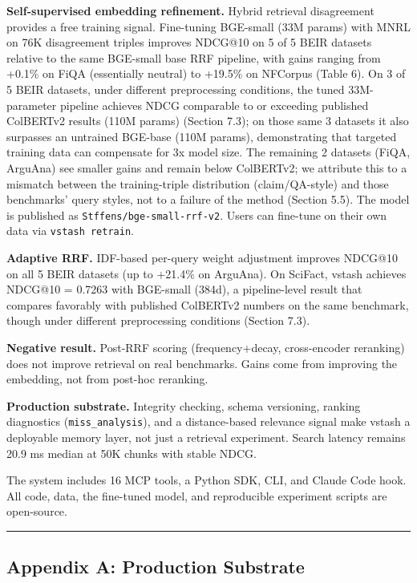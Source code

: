 \documentclass[
  11pt]{article}
\begin{document}
\textbf{Self-supervised embedding refinement.} Hybrid retrieval disagreement provides a free training signal. Fine-tuning BGE-small (33M params) with MNRL on 76K disagreement triples improves NDCG@10 on 5 of 5 BEIR datasets relative to the same BGE-small base RRF pipeline, with gains ranging from +0.1\% on FiQA (essentially neutral) to +19.5\% on NFCorpus (Table 6). On 3 of 5 BEIR datasets, under different preprocessing conditions, the tuned 33M-parameter pipeline achieves NDCG comparable to or exceeding published ColBERTv2 results (110M params) (Section 7.3); on those same 3 datasets it also surpasses an untrained BGE-base (110M params), demonstrating that targeted training data can compensate for 3x model size. The remaining 2 datasets (FiQA, ArguAna) see smaller gains and remain below ColBERTv2; we attribute this to a mismatch between the training-triple distribution (claim/QA-style) and those benchmarks' query styles, not to a failure of the method (Section 5.5). The model is published as \texttt{Stffens/bge-small-rrf-v2}. Users can fine-tune on their own data via \texttt{vstash\ retrain}.

\textbf{Adaptive RRF.} IDF-based per-query weight adjustment improves NDCG@10 on all 5 BEIR datasets (up to +21.4\% on ArguAna). On SciFact, vstash achieves NDCG@10 = 0.7263 with BGE-small (384d), a pipeline-level result that compares favorably with published ColBERTv2 numbers on the same benchmark, though under different preprocessing conditions (Section 7.3).

\textbf{Negative result.} Post-RRF scoring (frequency+decay, cross-encoder reranking) does not improve retrieval on real benchmarks. Gains come from improving the embedding, not from post-hoc reranking.

\textbf{Production substrate.} Integrity checking, schema versioning, ranking diagnostics (\texttt{miss\_analysis}), and a distance-based relevance signal make vstash a deployable memory layer, not just a retrieval experiment. Search latency remains 20.9 ms median at 50K chunks with stable NDCG.

The system includes 16 MCP tools, a Python SDK, CLI, and Claude Code hook. All code, data, the fine-tuned model, and reproducible experiment scripts are open-source.

\begin{center}\rule{0.5\linewidth}{0.5pt}\end{center}

\subsection{Appendix A: Production Substrate}\label{appendix-a-production-substrate}
\end{document}
